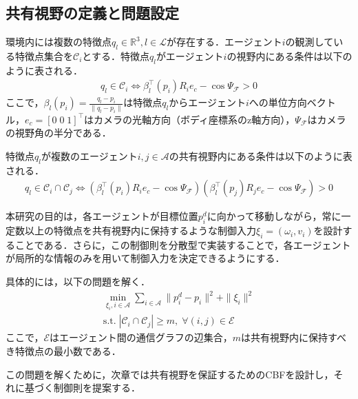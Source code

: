 \subsection{共有視野の定義と問題設定}

環境内には複数の特徴点$q_l \in \mathbb{R}^3, l \in \mathcal{L}$が存在する．エージェント$i$の観測している特徴点集合を$\mathcal{C}_i$とする．特徴点$q_l$がエージェント$i$の視野内にある条件は以下のように表される．
\begin{equation}
\begin{aligned}
q_l \in \mathcal{C}_i \iff \beta_l^{\top}(p_i)R_i e_c - \cos\Psi_\mathcal{F} > 0
\label{eq:fov_condition}
\end{aligned}
\end{equation}
ここで，$\beta_l(p_i) = \frac{q_l - p_i}{\|q_l - p_i\|}$は特徴点$q_l$からエージェント$i$への単位方向ベクトル，$e_c = [0 \; 0 \; 1]^\top$はカメラの光軸方向（ボディ座標系のz軸方向），$\Psi_\mathcal{F}$はカメラの視野角の半分である．

特徴点$q_l$が複数のエージェント$i, j \in \mathcal{A}$の共有視野内にある条件は以下のように表される．
\begin{equation}
\begin{aligned}
q_l \in \mathcal{C}_i \cap \mathcal{C}_j \iff (\beta_l^{\top}(p_i)R_i e_c - \cos\Psi_\mathcal{F})(\beta_l^{\top}(p_j)R_j e_c - \cos\Psi_\mathcal{F}) > 0
\label{eq:shared_fov_condition}
\end{aligned}
\end{equation}

本研究の目的は，各エージェントが目標位置$p_i^d$に向かって移動しながら，常に一定数以上の特徴点を共有視野内に保持するような制御入力$\xi_i = (\omega_i, v_i)$を設計することである．さらに，この制御則を分散型で実装することで，各エージェントが局所的な情報のみを用いて制御入力を決定できるようにする．

具体的には，以下の問題を解く．
\begin{equation}
\begin{aligned}
\min_{\xi_i, i \in \mathcal{A}} \sum_{i \in \mathcal{A}} \|p_i^d - p_i\|^2 + \|\xi_i\|^2 \\
\text{s.t.} \; |\mathcal{C}_i \cap \mathcal{C}_j| \geq m, \; \forall (i,j) \in \mathcal{E}
\label{eq:problem}
\end{aligned}
\end{equation}
ここで，$\mathcal{E}$はエージェント間の通信グラフの辺集合，$m$は共有視野内に保持すべき特徴点の最小数である．

この問題を解くために，次章では共有視野を保証するためのCBFを設計し，それに基づく制御則を提案する．
